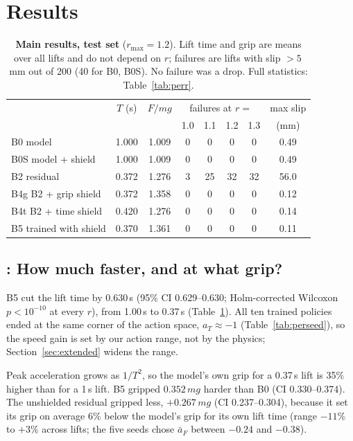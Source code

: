 \section{Results}\label{sec:results}
\begin{table}[t]\centering\footnotesize
\caption{\textbf{Main results, test set} ($r_{\max}=1.2$). Lift time and grip are means over all lifts and do not depend on
$r$; failures are lifts with slip $>5$\,mm out of 200 (40 for B0, B0S). No failure was a drop. Full statistics:
Table~\ref{tab:perr}.}\label{tab:main}
\setlength{\tabcolsep}{3.2pt}
\begin{tabular}{@{}lccccccc@{}}\toprule
 & $T$ (s) & $F/mg$ & \multicolumn{4}{c}{failures at $r=$} & max slip\\
 & & & 1.0 & 1.1 & 1.2 & 1.3 & (mm)\\\midrule
B0 model & 1.000 & 1.009 & 0 & 0 & 0 & 0 & 0.49\\
B0S model + shield & 1.000 & 1.009 & 0 & 0 & 0 & 0 & 0.49\\
B2 residual & 0.372 & 1.276 & 3 & 25 & 32 & 32 & 56.0\\
B4g B2 + grip shield & 0.372 & 1.358 & 0 & 0 & 0 & 0 & 0.12\\
B4t B2 + time shield & 0.420 & 1.276 & 0 & 0 & 0 & 0 & 0.14\\
B5 trained with shield & 0.370 & 1.361 & 0 & 0 & 0 & 0 & 0.11\\\bottomrule
\end{tabular}\end{table}

\subsection{: How much faster, and at what grip?}
 B5 cut the lift time by 0.630\,s (95\% CI
0.629--0.630; Holm-corrected Wilcoxon $p<10^{-10}$ at every $r$), from 1.00\,s to 0.37\,s (Table~\ref{tab:main}). All ten
trained policies ended at the same corner of the action space, $a_T\approx-1$ (Table~\ref{tab:perseed}), so the speed gain
is set by our action range, not by the physics; Section~\ref{sec:extended} widens the range.

 Peak acceleration grows as $1/T^2$, so the model's own grip for a 0.37\,s lift is
35\% higher than for a 1\,s lift. B5 gripped $0.352\,mg$ harder than B0 (CI 0.330--0.374). The unshielded residual gripped
less, $+0.267\,mg$ (CI 0.237--0.304), because it set its grip on average 6\% below the model's grip for its own lift time
(range $-11$\% to $+3$\% across lifts; the five seeds chose $\bar a_F$ between $-0.24$ and $-0.38$).

